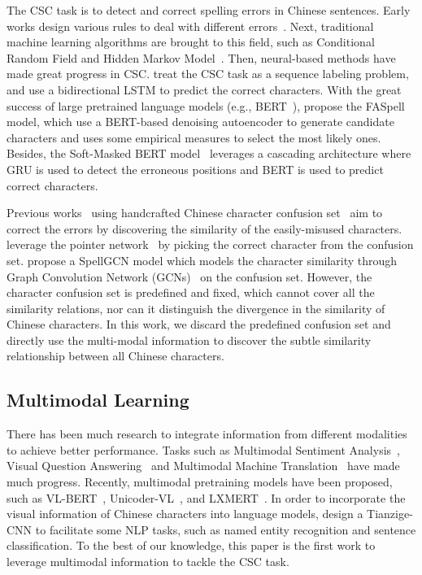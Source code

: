 \documentclass[11pt,a4paper]{article}
\begin{document}
The CSC task is to detect and correct spelling errors in Chinese sentences. Early works design various rules to deal with different errors~\citep{kuas, ntou}. Next, traditional machine learning algorithms are brought to this field, such as Conditional Random Field and Hidden Markov Model~\citep{nctu, HANSpeller++}. Then, neural-based methods have made great progress in CSC. \citet{spell-corpus} treat the CSC task as a sequence labeling problem, and use a bidirectional LSTM to predict the correct characters. With the great success of large pretrained language models (e.g., BERT~\cite{bert}), \citet{FASPell} propose the FASpell model, which use a BERT-based denoising autoencoder to generate candidate characters and uses some empirical measures to select the most likely ones. Besides, the Soft-Masked BERT model~\citep{softmask-spell} leverages a cascading architecture where GRU is used to detect the erroneous positions and BERT is used to predict correct characters.

Previous works~\cite{yu2014chinese,pointer-spell,spellgcn} using handcrafted Chinese character confusion set~\citep{conf} aim to correct the errors by discovering the similarity of the easily-misused characters.
\citet{pointer-spell} leverage the pointer network~\cite{vinyals2015pointer} by picking the correct character from the confusion set.
\citet{spellgcn} propose a SpellGCN model which models the character similarity through Graph Convolution Network (GCNs)~\citep{gcn} on the confusion set.
However, the character confusion set is predefined and fixed, which cannot cover all the similarity relations, nor can it distinguish the divergence in the similarity of Chinese characters. 
In this work, we discard the predefined confusion set and directly use the multi-modal information to discover the subtle similarity relationship between all Chinese characters.

\subsection{Multimodal Learning}



There has been much research to integrate information from different modalities to achieve better performance. 
Tasks such as Multimodal Sentiment Analysis~\citep{mm-senti, msa-2}, Visual Question Answering~\citep{vqa, vqa-2} and Multimodal Machine Translation~\citep{mmt-1, mmt-2} have made much progress.
Recently, multimodal pretraining models have been proposed, such as VL-BERT~\citep{vl-bert}, Unicoder-VL~\citep{uni-vl}, and LXMERT~\citep{lxmert}. 
In order to incorporate the visual information of Chinese characters into language models, \citet{glyce} design a Tianzige-CNN to facilitate some NLP tasks, such as named entity recognition and sentence classification. To the best of our knowledge, this paper is the first work to leverage multimodal information to tackle the CSC task.
\end{document}
